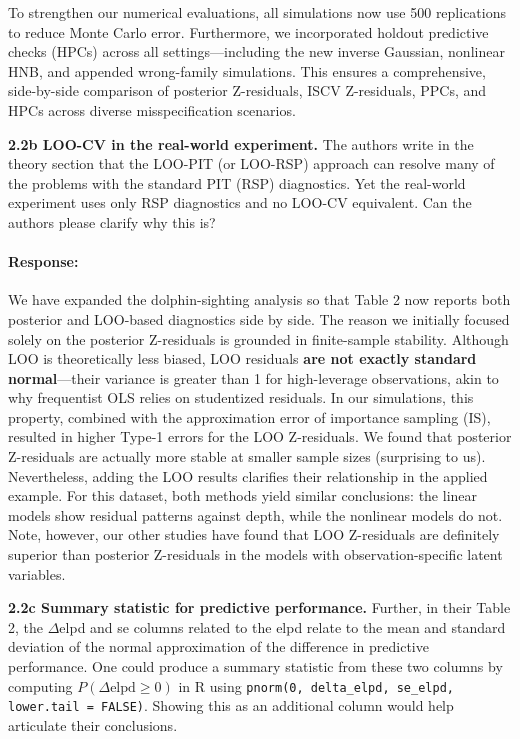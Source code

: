 \documentclass[11pt]{article}
\newcommand*{\mybox}[2]{%
  \par\medskip\noindent
  \colorbox{#1!30}{\parbox{.98\linewidth}{#2}}%
  \par\medskip
}
\begin{document}
To strengthen our numerical evaluations, all simulations now use 500 replications to reduce Monte Carlo error. Furthermore, we incorporated holdout predictive checks (HPCs) across all settings---including the new inverse Gaussian, nonlinear HNB, and appended wrong-family simulations. This ensures a comprehensive, side-by-side comparison of posterior Z-residuals, ISCV Z-residuals, PPCs, and HPCs across diverse misspecification scenarios.


\mybox{gray}{\textbf{2.2b LOO-CV in the real-world experiment.} The authors write in the theory section that the LOO-PIT (or LOO-RSP) approach can resolve many of the problems with the standard PIT (RSP) diagnostics. Yet the real-world experiment uses only RSP diagnostics and no LOO-CV equivalent. Can the authors please clarify why this is?}

\paragraph{Response:}

We have expanded the dolphin-sighting analysis so that Table 2 now reports both posterior and LOO-based diagnostics side by side. The reason we initially focused solely on the posterior Z-residuals is grounded in finite-sample stability. Although LOO is theoretically less biased, LOO residuals \textbf{are not exactly standard normal}—their variance is greater than 1 for high-leverage observations, akin to why frequentist OLS relies on studentized residuals. In our simulations, this property, combined with the approximation error of importance sampling (IS), resulted in higher Type-1 errors for the LOO Z-residuals. We found that posterior Z-residuals are actually  more stable at smaller sample sizes (surprising to us). Nevertheless, adding the LOO results clarifies their relationship in the applied example. For this dataset, both methods yield similar conclusions: the linear models show residual patterns against depth, while the nonlinear models do not. Note, however, our other studies have found that LOO Z-residuals are definitely superior than posterior Z-residuals in the models with observation-specific latent variables. 


\mybox{gray}{\textbf{2.2c Summary statistic for predictive performance.} Further, in their Table 2, the $\Delta$elpd and se columns related to the elpd relate to the mean and standard deviation of the normal approximation of the difference in predictive performance. One could produce a summary statistic from these two columns by computing $P(\Delta\mathrm{elpd}\ge 0)$ in R using \texttt{pnorm(0, delta\_elpd, se\_elpd, lower.tail = FALSE)}. Showing this as an additional column would help articulate their conclusions.}
\end{document}
